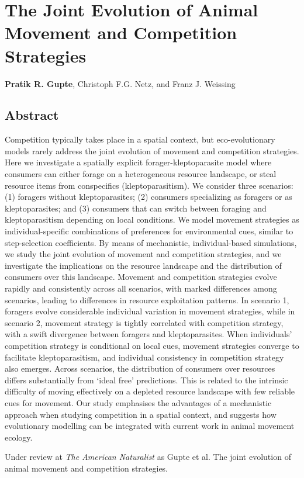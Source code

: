 \chapter{The Joint Evolution of Animal Movement and Competition Strategies}\label{ch:kleptomove}

\noindent \textbf{Pratik R. Gupte}, Christoph F.G. Netz, and Franz J. Weissing

\section*{Abstract}

\footnotesize{
    Competition typically takes place in a spatial context, but eco-evolutionary models rarely address the joint evolution of movement and competition strategies. 
    Here we investigate a spatially explicit forager-kleptoparasite model where consumers can either forage on a heterogeneous resource landscape, or steal resource items from conspecifics (kleptoparasitism). 
    We consider three scenarios: (1) foragers without kleptoparasites; (2) consumers specializing as foragers or as kleptoparasites; and (3) consumers that can switch between foraging and kleptoparasitism depending on local conditions.
    We model movement strategies as individual-specific combinations of preferences for environmental cues, similar to step-selection coefficients.
    By means of mechanistic, individual-based simulations, we study the joint evolution of movement and competition strategies, and we investigate the implications on the resource landscape and the distribution of consumers over this landscape.
    Movement and competition strategies evolve rapidly and consistently across all scenarios, with marked differences among scenarios, leading to differences in resource exploitation patterns.
    In scenario 1, foragers evolve considerable individual variation in movement strategies, while in scenario 2, movement strategy is tightly correlated with competition strategy, with a swift divergence between foragers and kleptoparasites.
    When individuals' competition strategy is conditional on local cues, movement strategies converge to facilitate kleptoparasitism, and individual consistency in competition strategy also emerges.
    Across scenarios, the distribution of consumers over resources differs substantially from `ideal free' predictions. 
    This is related to the intrinsic difficulty of moving effectively on a depleted resource landscape with few reliable cues for movement.
    Our study emphasises the advantages of a mechanistic approach when studying competition in a spatial context, and suggests how evolutionary modelling can be integrated with current work in animal movement ecology.

    \medskip

    \noindent {\large{\color{Maroon}$\Delta$}} Under review at \textit{The American Naturalist} as Gupte et al. The joint evolution of animal movement and competition strategies.
}

\clearpage
